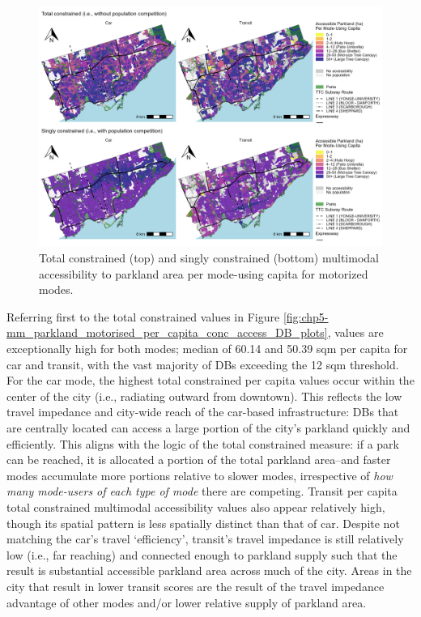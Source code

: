 \documentclass[
11pt, %
oneside, %
english, %
singlespacing, %
]{macthesis} %
\begin{document}
\begin{figure}

{\centering \includegraphics[width=6in]{./data/figures/chp5-mm_parkland_motorised_per_capita_conc_access_DB_plots} 

}

\caption{Total constrained (top) and singly constrained (bottom) multimodal accessibility to parkland area per mode-using capita for motorized modes.\label{fig:chp5-mm_parkland_motorised_per_capita_conc_access_DB_plots}}\label{fig:unnamed-chunk-79}
\end{figure}

Referring first to the total constrained values in Figure \ref{fig:chp5-mm_parkland_motorised_per_capita_conc_access_DB_plots}, values are exceptionally high for both modes; median of 60.14 and 50.39 sqm per capita for car and transit, with the vast majority of DBs exceeding the 12 sqm threshold. For the car mode, the highest total constrained per capita values occur within the center of the city (i.e., radiating outward from downtown). This reflects the low travel impedance and city-wide reach of the car-based infrastructure: DBs that are centrally located can access a large portion of the city's parkland quickly and efficiently. This aligns with the logic of the total constrained measure: if a park can be reached, it is allocated a portion of the total parkland area--and faster modes accumulate more portions relative to slower modes, irrespective of \emph{how many mode-users of each type of mode} there are competing. Transit per capita total constrained multimodal accessibility values also appear relatively high, though its spatial pattern is less spatially distinct than that of car. Despite not matching the car's travel `efficiency', transit's travel impedance is still relatively low (i.e., far reaching) and connected enough to parkland supply such that the result is substantial accessible parkland area across much of the city. Areas in the city that result in lower transit scores are the result of the travel impedance advantage of other modes and/or lower relative supply of parkland area.
\end{document}
